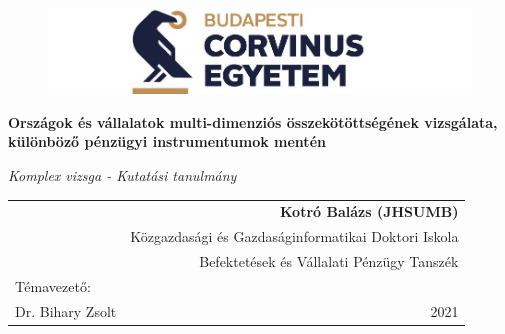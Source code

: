 \documentclass[12pt,bibliography=totoc]{article}
\begin{document}
\begin{titlepage}

\begin{figure}[H]
\includegraphics[width=11.5cm]{corvinus}
\centering
\end{figure}



 \begin{center}
\Huge\textbf{Országok és vállalatok multi-dimenziós összekötöttségének vizsgálata, különböző pénzügyi instrumentumok mentén}\\
 
\vspace{3cm}


 \Large\textit{Komplex vizsga - Kutatási tanulmány}

\end{center}

\vspace{5.5cm}

\large\color{black}
\begin{tabularx}{\textwidth}{Xr}
& \textbf{\Large Kotró Balázs (JHSUMB)}\vspace{0.8cm}\\
 & Közgazdasági és Gazdaságinformatikai Doktori Iskola \\
 & Befektetések és Vállalati Pénzügy Tanszék\\[2cm]

Témavezető:& \\
 Dr. Bihary Zsolt&2021\\
\end{tabularx}

\end{titlepage}
\end{document}
